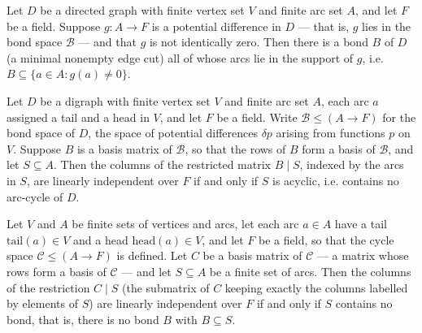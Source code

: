 \begin{theorem}
\label{CycleSpace.exists_isBond_subset_support_of_mem_bondSpace}
\leanok
{}
Let $D$ be a directed graph with finite vertex set $V$ and finite arc set $A$, and let
$F$ be a field. Suppose $g \colon A \to F$ is a potential difference in $D$ — that is,
$g$ lies in the bond space $\mathcal{B}$ — and that $g$ is not identically zero. Then
there is a bond $B$ of $D$ (a minimal nonempty edge cut) all of whose arcs lie in the
support of $g$, i.e. $B \subseteq \{a \in A : g(a) \neq 0\}$.
\end{theorem}

\begin{theorem}
\label{CycleSpace.basisMatrix_bondSpace_cols_linearIndependent_iff}
Let $D$ be a digraph with finite vertex set $V$ and finite arc set $A$, each arc $a$
assigned a tail and a head in $V$, and let $F$ be a field. Write $\mathcal{B} \le (A \to
F)$ for the bond space of $D$, the space of potential differences $\delta p$ arising
from functions $p$ on $V$. Suppose $B$ is a basis matrix of $\mathcal{B}$, so that the
rows of $B$ form a basis of $\mathcal{B}$, and let $S \subseteq A$. Then the columns of
the restricted matrix $B \mid S$, indexed by the arcs in $S$, are linearly independent
over $F$ if and only if $S$ is acyclic, i.e. contains no arc-cycle of $D$.
\end{theorem}

\begin{theorem}
\label{CycleSpace.basisMatrix_cycleSpace_cols_linearIndependent_iff}
\leanok
{}
Let $V$ and $A$ be finite sets of vertices and arcs, let each arc $a\in A$ have a tail
$\mathrm{tail}(a)\in V$ and a head $\mathrm{head}(a)\in V$, and let $F$ be a field, so
that the cycle space $\mathcal{C}\le (A\to F)$ is defined. Let $C$ be a basis matrix of
$\mathcal{C}$ — a matrix whose rows form a basis of $\mathcal{C}$ — and let $S\subseteq
A$ be a finite set of arcs. Then the columns of the restriction $C\mid S$ (the submatrix
of $C$ keeping exactly the columns labelled by elements of $S$) are linearly independent
over $F$ if and only if $S$ contains no bond, that is, there is no bond $B$ with
$B\subseteq S$.
\end{theorem}

